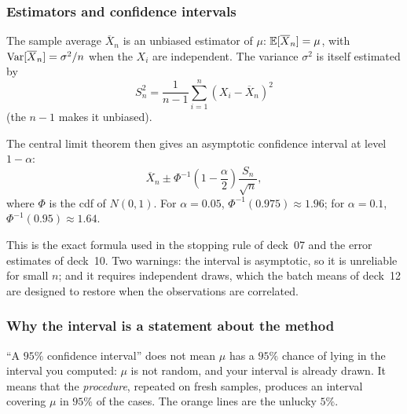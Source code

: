 \documentclass[aspectratio=169]{beamer}
\begin{document}
\begin{frame}
\frametitle{Estimators and confidence intervals}
\small

The sample average $\overline{X}_n$ is an {\red unbiased} estimator of $\mu$: ${\mathbb{E}}[\overline{X}_n] = \mu$, with $\operatorname{Var}[\overline{X}_n] = \sigma^2/n$ when the $X_i$ are independent.
The variance $\sigma^2$ is itself estimated by
\[
S_n^2 = \frac{1}{n-1}\sum_{i=1}^n \left( X_i - \overline{X}_n \right)^2
\]
(the $n-1$ makes it unbiased).

\mbox{}

The central limit theorem then gives an {\red asymptotic confidence interval} at level $1-\alpha$:
\[
\overline{X}_n \pm \Phi^{-1}\!\left(1-\frac{\alpha}{2}\right)\frac{S_n}{\sqrt{n}},
\]
where $\Phi$ is the cdf of $N(0,1)$. For $\alpha = 0.05$, $\Phi^{-1}(0.975) \approx 1.96$; for $\alpha = 0.1$, $\Phi^{-1}(0.95) \approx 1.64$.

\mbox{}

{\footnotesize This is the exact formula used in the stopping rule of deck~07 and the error estimates of deck~10. Two warnings: the interval is {\red asymptotic}, so it is unreliable for small $n$; and it requires {\red independent} draws, which the batch means of deck~12 are designed to restore when the observations are correlated.}

\end{frame}

\begin{frame}
\frametitle{Why the interval is a statement about the method}

\begin{center}
\end{center}

\vspace{-2mm}

{\footnotesize ``A $95\%$ confidence interval'' does {\red not} mean $\mu$ has a $95\%$ chance of lying in the interval you computed: $\mu$ is not random, and your interval is already drawn. It means that the {\it procedure}, repeated on fresh samples, produces an interval covering $\mu$ in $95\%$ of the cases. The orange lines are the unlucky $5\%$.}

\end{frame}
\end{document}
